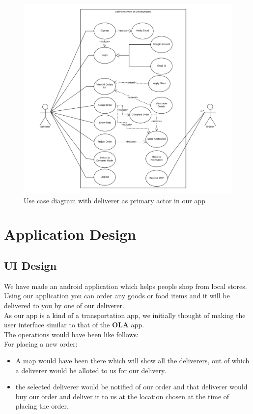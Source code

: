 \documentclass{report}
\begin{document}
\begin{figure}[h!]
\includegraphics[width=16cm]{DelivererUseCase.png}
\caption{Use case diagram with deliverer as primary actor in our app}
\label{fig:NASA_Logo}
\end{figure}


\chapter{Application Design}

\section{UI Design}
We have made an android application which helps people shop from local stores. Using our application you can order any goods or food items and it will be delivered to you by one of our deliverer.\\

As our app is a kind of a transportation app, we initially thought of making the user interface similar to that of the \textbf{OLA} app.\\
The operations would have been like follows:\\

For placing a new order:
\begin{itemize}
\item A map would have been there which will show all the deliverers, out of which a deliverer would be alloted to us for our delivery.
\item the selected deliverer would be notified of our order and that deliverer would buy our order and deliver it to us at the location chosen at the time of placing the order.
\end{itemize}
\end{document}
